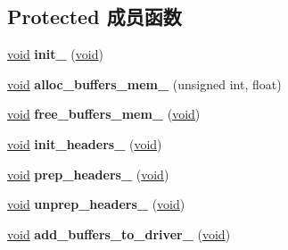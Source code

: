 \subsection*{Protected 成员函数}
\begin{DoxyCompactItemize}
\item 
\mbox{\label{classaudio__wavein_a2d384c76593c05fdca59d0bcdcf2487b}} 
\hyperlink{interfacevoid}{void} {\bfseries init\+\_\+} (\hyperlink{interfacevoid}{void})
\item 
\mbox{\label{classaudio__wavein_a823cf94e5f8e49300ee5e9f87a1f8743}} 
\hyperlink{interfacevoid}{void} {\bfseries alloc\+\_\+buffers\+\_\+mem\+\_\+} (unsigned int, float)
\item 
\mbox{\label{classaudio__wavein_abc2df0c28d490a966f6f95004bffae63}} 
\hyperlink{interfacevoid}{void} {\bfseries free\+\_\+buffers\+\_\+mem\+\_\+} (\hyperlink{interfacevoid}{void})
\item 
\mbox{\label{classaudio__wavein_a57dd50562ca57e43672dd4f1d9d3737d}} 
\hyperlink{interfacevoid}{void} {\bfseries init\+\_\+headers\+\_\+} (\hyperlink{interfacevoid}{void})
\item 
\mbox{\label{classaudio__wavein_a41a215723e10f78c74990c5490ccf494}} 
\hyperlink{interfacevoid}{void} {\bfseries prep\+\_\+headers\+\_\+} (\hyperlink{interfacevoid}{void})
\item 
\mbox{\label{classaudio__wavein_a5bd2c96494f3c8158acfcea4ede7c4b8}} 
\hyperlink{interfacevoid}{void} {\bfseries unprep\+\_\+headers\+\_\+} (\hyperlink{interfacevoid}{void})
\item 
\mbox{\label{classaudio__wavein_a7a83abf669555599e7236d3e59150e9d}} 
\hyperlink{interfacevoid}{void} {\bfseries add\+\_\+buffers\+\_\+to\+\_\+driver\+\_\+} (\hyperlink{interfacevoid}{void})
\end{DoxyCompactItemize}
